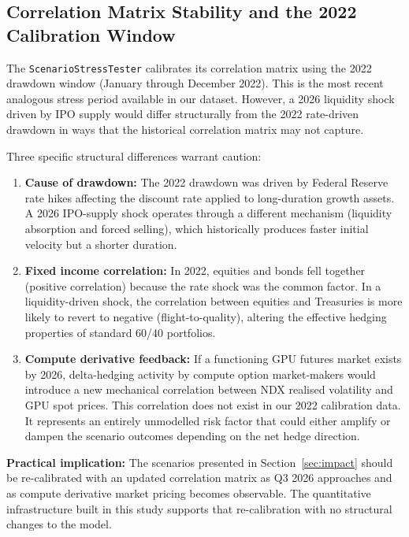\subsection{Correlation Matrix Stability and the 2022 Calibration Window}

The \texttt{ScenarioStressTester} calibrates its correlation matrix using the 2022
drawdown window (January through December 2022). This is the most recent analogous
stress period available in our dataset. However, a 2026 liquidity shock driven by
IPO supply would differ structurally from the 2022 rate-driven drawdown in ways that
the historical correlation matrix may not capture.

Three specific structural differences warrant caution:

\begin{enumerate}
  \item \textbf{Cause of drawdown:} The 2022 drawdown was driven by Federal Reserve
        rate hikes affecting the discount rate applied to long-duration growth assets.
        A 2026 IPO-supply shock operates through a different mechanism (liquidity
        absorption and forced selling), which historically produces faster initial
        velocity but a shorter duration.
  \item \textbf{Fixed income correlation:} In 2022, equities and bonds fell together
        (positive correlation) because the rate shock was the common factor. In a
        liquidity-driven shock, the correlation between equities and Treasuries is
        more likely to revert to negative (flight-to-quality), altering the effective
        hedging properties of standard 60/40 portfolios.
  \item \textbf{Compute derivative feedback:} If a functioning GPU futures market
        exists by 2026, delta-hedging activity by compute option market-makers would
        introduce a new mechanical correlation between NDX realised volatility and GPU
        spot prices. This correlation does not exist in our 2022 calibration data. It
        represents an entirely unmodelled risk factor that could either amplify or
        dampen the scenario outcomes depending on the net hedge direction.
\end{enumerate}

\textbf{Practical implication:} The scenarios presented in Section~\ref{sec:impact}
should be re-calibrated with an updated correlation matrix as Q3 2026 approaches
and as compute derivative market pricing becomes observable. The quantitative
infrastructure built in this study supports that re-calibration with no
structural changes to the model.

